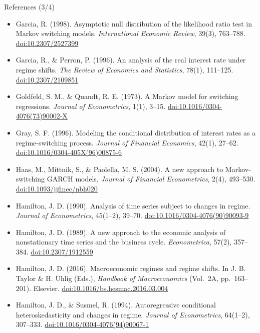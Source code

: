 \begin{frame}{References (3/4)}
\itemsize{\tiny}
\begin{itemize}
    \item Garcia, R. (1998). Asymptotic null distribution of the likelihood ratio test in Markov switching models. \textit{International Economic Review}, 39(3), 763--788. \href{https://doi.org/10.2307/2527399}{doi:10.2307/2527399}
    \item Garcia, R., \& Perron, P. (1996). An analysis of the real interest rate under regime shifts. \textit{The Review of Economics and Statistics}, 78(1), 111--125. \href{https://doi.org/10.2307/2109851}{doi:10.2307/2109851}
    \item Goldfeld, S. M., \& Quandt, R. E. (1973). A Markov model for switching regressions. \textit{Journal of Econometrics}, 1(1), 3--15. \href{https://doi.org/10.1016/0304-4076(73)90002-X}{doi:10.1016/0304-4076(73)90002-X}
    \item Gray, S. F. (1996). Modeling the conditional distribution of interest rates as a regime-switching process. \textit{Journal of Financial Economics}, 42(1), 27--62. \href{https://doi.org/10.1016/0304-405X(96)00875-6}{doi:10.1016/0304-405X(96)00875-6}
    \item Haas, M., Mittnik, S., \& Paolella, M. S. (2004). A new approach to Markov-switching GARCH models. \textit{Journal of Financial Econometrics}, 2(4), 493--530. \href{https://doi.org/10.1093/jjfinec/nbh020}{doi:10.1093/jjfinec/nbh020}
    \item Hamilton, J. D. (1990). Analysis of time series subject to changes in regime. \textit{Journal of Econometrics}, 45(1--2), 39--70. \href{https://doi.org/10.1016/0304-4076(90)90093-9}{doi:10.1016/0304-4076(90)90093-9}
    \item Hamilton, J. D. (1989). A new approach to the economic analysis of nonstationary time series and the business cycle. \textit{Econometrica}, 57(2), 357--384. \href{https://doi.org/10.2307/1912559}{doi:10.2307/1912559}
    \item Hamilton, J. D. (2016). Macroeconomic regimes and regime shifts. In J. B. Taylor \& H. Uhlig (Eds.), \textit{Handbook of Macroeconomics} (Vol.\ 2A, pp.\ 163--201). Elsevier. \href{https://doi.org/10.1016/bs.hesmac.2016.03.004}{doi:10.1016/bs.hesmac.2016.03.004}
    \item Hamilton, J. D., \& Susmel, R. (1994). Autoregressive conditional heteroskedasticity and changes in regime. \textit{Journal of Econometrics}, 64(1--2), 307--333. \href{https://doi.org/10.1016/0304-4076(94)90067-1}{doi:10.1016/0304-4076(94)90067-1}

\end{itemize}
\end{frame}
